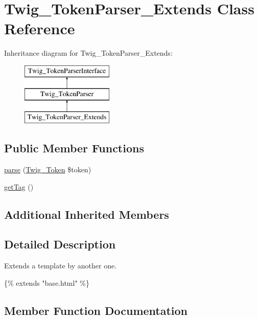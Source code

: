 \hypertarget{class_twig___token_parser___extends}{}\section{Twig\+\_\+\+Token\+Parser\+\_\+\+Extends Class Reference}
\label{class_twig___token_parser___extends}
Inheritance diagram for Twig\+\_\+\+Token\+Parser\+\_\+\+Extends\+:\begin{figure}[H]
\begin{center}
\leavevmode
\includegraphics[height=3.000000cm]{class_twig___token_parser___extends}
\end{center}
\end{figure}
\subsection*{Public Member Functions}
\begin{DoxyCompactItemize}
\item 
\hyperlink{class_twig___token_parser___extends_a5dfa2e269321584fb74e8b43dabe0efd}{parse} (\hyperlink{class_twig___token}{Twig\+\_\+\+Token} \$token)
\item 
\hyperlink{class_twig___token_parser___extends_ab86ba36154b20e6bbfa3ba705f12f9d6}{get\+Tag} ()
\end{DoxyCompactItemize}
\subsection*{Additional Inherited Members}


\subsection{Detailed Description}
Extends a template by another one.


\begin{DoxyPre}
 \{\% extends "base.html" \%\}
\end{DoxyPre}
 

\subsection{Member Function Documentation}
\hypertarget{class_twig___token_parser___extends_ab86ba36154b20e6bbfa3ba705f12f9d6}{}
